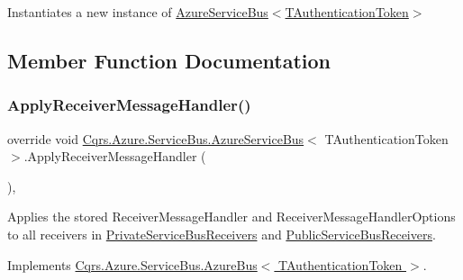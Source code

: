 Instantiates a new instance of \hyperlink{classCqrs_1_1Azure_1_1ServiceBus_1_1AzureServiceBus_a44845c00c29574c2fa2d43a8a6b124ca_a44845c00c29574c2fa2d43a8a6b124ca}{Azure\+Service\+Bus$<$\+T\+Authentication\+Token$>$} 



\subsection{Member Function Documentation}
\mbox{\label{classCqrs_1_1Azure_1_1ServiceBus_1_1AzureServiceBus_a6ea94560e02fce0d920c467062f5fc98_a6ea94560e02fce0d920c467062f5fc98}} 
\subsubsection{\texorpdfstring{Apply\+Receiver\+Message\+Handler()}{ApplyReceiverMessageHandler()}}
{\footnotesize\ttfamily override void \hyperlink{classCqrs_1_1Azure_1_1ServiceBus_1_1AzureServiceBus}{Cqrs.\+Azure.\+Service\+Bus.\+Azure\+Service\+Bus}$<$ T\+Authentication\+Token $>$.Apply\+Receiver\+Message\+Handler (\begin{DoxyParamCaption}{ }\end{DoxyParamCaption})\hspace{0.3cm}{\ttfamily [protected]}, {\ttfamily [virtual]}}



Applies the stored Receiver\+Message\+Handler and Receiver\+Message\+Handler\+Options to all receivers in \hyperlink{classCqrs_1_1Azure_1_1ServiceBus_1_1AzureServiceBus_ac52e1a7e17f4ffb80f95d31424101aaa_ac52e1a7e17f4ffb80f95d31424101aaa}{Private\+Service\+Bus\+Receivers} and \hyperlink{classCqrs_1_1Azure_1_1ServiceBus_1_1AzureServiceBus_ac73f294e6a99655f2ff7e391646f2e5d_ac73f294e6a99655f2ff7e391646f2e5d}{Public\+Service\+Bus\+Receivers}. 



Implements \hyperlink{classCqrs_1_1Azure_1_1ServiceBus_1_1AzureBus_aad25a164e9e526c59d8ef98635c98095_aad25a164e9e526c59d8ef98635c98095}{Cqrs.\+Azure.\+Service\+Bus.\+Azure\+Bus$<$ T\+Authentication\+Token $>$}.

